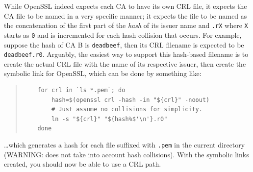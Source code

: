 \documentclass{article}
\begin{document}
While OpenSSL indeed expects each CA to have its own CRL file, it expects the CA file to be named in a very specific manner; it expects the file to be named as the concatenation of the first part of the \emph{hash} of its issuer name and \texttt{.rX} where \texttt{X} starts as \texttt{0} and is incremented for each hash collision that occurs.  For example, suppose the hash of CA B is \texttt{deadbeef}, then its CRL filename is expected to be \texttt{deadbeef.r0}.  Arguably, the easiest way to support this hash-based filename is to create the actual CRL file with the name of its respective issuer, then create the symbolic link for OpenSSL, which can be done by something like:
\begin{quote}
\begin{verbatim}
	for crl in `ls *.pem`; do
		hash=$(openssl crl -hash -in "${crl}" -noout)
		# Just assume no collisions for simplicity.
		ln -s "${crl}" "${hash%$'\n'}.r0"
	done
\end{verbatim}
\end{quote}
\ldots which generates a hash for each file suffixed with \texttt{.pem} in the current directory (WARNING: does not take into account hash collisions).  With the symbolic links created, you should now be able to use a CRL path.
\end{document}
